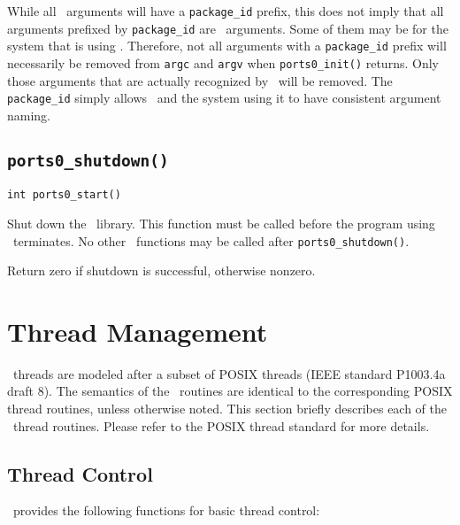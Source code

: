 While all \ports\ arguments will have a {\tt package\_id} prefix, this
does not imply that all arguments prefixed by {\tt package\_id} are
\portszero\ arguments.  Some of them may be for the system that is using
\portszero.  Therefore, not all arguments with a {\tt package\_id}
prefix will necessarily be removed from {\tt argc} and {\tt argv} when
{\tt ports0\_init()} returns.  Only those arguments that are actually
recognized by \portszero\ will be removed.  The {\tt package\_id} simply
allows \portszero\ and the system using it to have consistent argument
naming.


\subsection{\tt ports0\_shutdown()}
\begin{verbatim}
int ports0_start()
\end{verbatim}

Shut down the \portszero\ library.  This function must be called before
the program using \portszero\ terminates.  No other \portszero\
functions may be called after {\tt ports0\_shutdown()}.

Return zero if shutdown is successful, otherwise nonzero.


\section{Thread Management}

\portszero\ threads are modeled after a subset of POSIX threads (IEEE
standard P1003.4a draft 8).  The semantics of the \portszero\ routines
are identical to the corresponding POSIX thread routines, unless
otherwise noted.  This section briefly describes each of the \portszero\
thread routines.  Please refer to the POSIX thread standard for more
details. 

\subsection{Thread Control}

\portszero\ provides the following functions for basic thread control:

